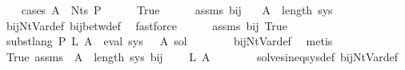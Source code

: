 \begin{isabellebody}
\ \ \isamarkupfalse%
\ {\isacharparenleft}{\kern0pt}cases\ {\isachardoublequoteopen}A\ {\isasymin}\ Nts\ P{\isachardoublequoteclose}{\isacharparenright}{\kern0pt}\isanewline
\ \ \ \ \isamarkupfalse%
\ True\isanewline
\ \ \ \ \isamarkupfalse%
\ assms{\isacharparenleft}{\kern0pt}{}{\isacharparenright}{\kern0pt}\ bij{\isacharunderscore}{\kern0pt}{\isasymgamma}{\isacharunderscore}{\kern0pt}{\isasymgamma}{\isacharprime}{\kern0pt}\ \isamarkupfalse%
\ {\isachardoublequoteopen}{\isasymgamma}{\isacharprime}{\kern0pt}\ A\ {\isacharless}{\kern0pt}\ length\ sys{\isachardoublequoteclose}\isanewline
\ \ \ \ \ \ \isamarkupfalse%
\ bij{\isacharunderscore}{\kern0pt}Nt{\isacharunderscore}{\kern0pt}Var{\isacharunderscore}{\kern0pt}def\ bij{\isacharunderscore}{\kern0pt}betw{\isacharunderscore}{\kern0pt}def\ \isamarkupfalse%
\ fastforce\isanewline
\ \ \ \ \isamarkupfalse%
\ assms{\isacharparenleft}{\kern0pt}{}{\isacharparenright}{\kern0pt}\ bij{\isacharunderscore}{\kern0pt}{\isasymgamma}{\isacharunderscore}{\kern0pt}{\isasymgamma}{\isacharprime}{\kern0pt}\ True\ \isamarkupfalse%
\ {\isachardoublequoteopen}subst{\isacharunderscore}{\kern0pt}lang\ P\ {\isacharquery}{\kern0pt}L{\isacharprime}{\kern0pt}\ A\ {\isacharequal}{\kern0pt}\ eval\ {\isacharparenleft}{\kern0pt}sys\ {\isacharbang}{\kern0pt}\ {\isasymgamma}{\isacharprime}{\kern0pt}\ A{\isacharparenright}{\kern0pt}\ sol{\isacharprime}{\kern0pt}{\isachardoublequoteclose}\isanewline
\ \ \ \ \ \ \isamarkupfalse%
\ bij{\isacharunderscore}{\kern0pt}Nt{\isacharunderscore}{\kern0pt}Var{\isacharunderscore}{\kern0pt}def\ \isamarkupfalse%
\ metis\isanewline
\ \ \ \ \isamarkupfalse%
\ \isamarkupfalse%
\ True\ assms{\isacharparenleft}{\kern0pt}{}{\isacharparenright}{\kern0pt}\ {\isacartoucheopen}{\isasymgamma}{\isacharprime}{\kern0pt}\ A\ {\isacharless}{\kern0pt}\ length\ sys{\isacartoucheclose}\ bij{\isacharunderscore}{\kern0pt}{\isasymgamma}{\isacharunderscore}{\kern0pt}{\isasymgamma}{\isacharprime}{\kern0pt}\ \isamarkupfalse%
\ {\isachardoublequoteopen}{\isasymdots}\ {\isasymsubseteq}\ {\isacharquery}{\kern0pt}L{\isacharprime}{\kern0pt}\ A{\isachardoublequoteclose}\isanewline
\ \ \ \ \ \ \isamarkupfalse%
\ solves{\isacharunderscore}{\kern0pt}ineq{\isacharunderscore}{\kern0pt}sys{\isacharunderscore}{\kern0pt}def\ bij{\isacharunderscore}{\kern0pt}Nt{\isacharunderscore}{\kern0pt}Var{\isacharunderscore}{\kern0pt}def\ \isamarkupfalse%

\end{isabellebody}
